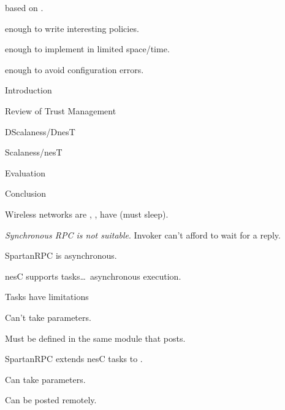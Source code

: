 
\begin{citemize}
\item {} based on \datalog.
\item {} enough to write interesting policies.
\item {} enough to implement in limited space/time.
\item {} enough to avoid configuration errors.
\end{citemize}
\stopslide


\begin{cenumerate}
\item Introduction
\item Review of Trust Management
\item {}
\item DScalaness/DnesT
\item Scalaness/nesT
\item Evaluation
\item Conclusion
\end{cenumerate}
\stopslide


\begin{citemize}
\item Wireless networks are , , have 
  (must sleep).
\item \emph{Synchronous RPC is not suitable}. Invoker can't afford to wait for a reply.
\item SpartanRPC is asynchronous.
\end{citemize}
\stopslide


\begin{citemize}
\item nesC supports tasks\ldots\ asynchronous execution.
\item Tasks have limitations
\begin{citemize}
  \item Can't take parameters.
  \item Must be defined in the same module that posts.
\end{citemize}
\item SpartanRPC extends nesC tasks to .
\begin{citemize}
  \item Can take parameters.
  \item Can be posted remotely.
\end{citemize}
\end{citemize}
\stopslide

